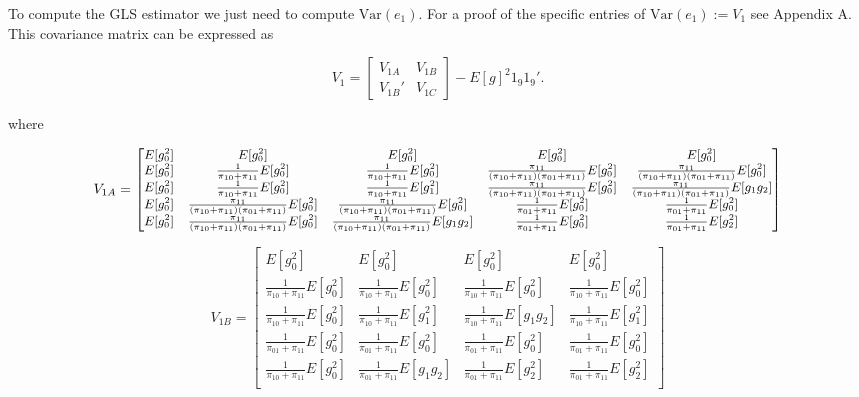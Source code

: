 \documentclass[
  letterpaper,
  DIV=11,
  numbers=noendperiod]{scrartcl}
\newcommand{\Var}{{\text{Var}}}
\begin{document}
To compute the GLS estimator we just need to compute \(\Var(e_1)\). For
a proof of the specific entries of \(\Var(e_1) := V_1\) see Appendix A.
This covariance matrix can be expressed as

\[
V_1 = 
\begin{bmatrix}
V_{1A} & V_{1B} \\
V_{1B}' & V_{1C}
\end{bmatrix} - E[g]^2 1_9 1_9'.
\]

where

\[
V_{1A} = 
{\small
\begin{bmatrix}
E[g_0^2] & E[g_0^2] & E[g_0^2] & E[g_0^2] & E[g_0^2] \\
E[g_0^2] & \frac{1}{\pi_{10} + \pi_{11}}E[g_0^2] & \frac{1}{\pi_{10} + \pi_{11}}
  E[g_0^2] & \frac{\pi_{11}}{(\pi_{10} + \pi_{11})(\pi_{01} + \pi_{11})} E[g_0^2]
  & \frac{\pi_{11}}{(\pi_{10} + \pi_{11})(\pi_{01} + \pi_{11})} E[g_0^2] \\
E[g_0^2] & \frac{1}{\pi_{10} + \pi_{11}} E[g_0^2] & \frac{1}{\pi_{10} +
  \pi_{11}}E[g_1^2] & \frac{\pi_{11}}{(\pi_{10} + \pi_{11})(\pi_{01} +
  \pi_{11})}E[g_0^2] & \frac{\pi_{11}}{(\pi_{10} + \pi_{11})(\pi_{01} +
  \pi_{11})}E[g_1g_2] \\
E[g_0^2] & \frac{\pi_{11}}{(\pi_{10} + \pi_{11})(\pi_{01} + \pi_{11})} E[g_0^2]
  & \frac{\pi_{11}}{(\pi_{10} + \pi_{11})(\pi_{01} + \pi_{11})} E[g_0^2] &
  \frac{1}{\pi_{01} + \pi_{11}}E[g_0^2] &
  \frac{1}{\pi_{01} + \pi_{11}}E[g_0^2] \\
E[g_0^2] & \frac{\pi_{11}}{(\pi_{10} + \pi_{11})(\pi_{01} + \pi_{11})} E[g_0^2]
  & \frac{\pi_{11}}{(\pi_{10} + \pi_{11})(\pi_{01} + \pi_{11})} E[g_1g_2] &
  \frac{1}{\pi_{01} + \pi_{11}}E[g_0^2] &
  \frac{1}{\pi_{01} + \pi_{11}}E[g_2^2] \\
\end{bmatrix}
}
\]

\[
V_{1B} = 
\begin{bmatrix}
E[g_0^2] & E[g_0^2] & E[g_0^2] & E[g_0^2] \\
\frac{1}{\pi_{10} + \pi_{11}} E[g_0^2] & \frac{1}{\pi_{10} + \pi_{11}} E[g_0^2] &
  \frac{1}{\pi_{10} + \pi_{11}} E[g_0^2] & \frac{1}{\pi_{10} + \pi_{11}} E[g_0^2] \\
\frac{1}{\pi_{10} + \pi_{11}} E[g_0^2] & \frac{1}{\pi_{10} + \pi_{11}} E[g_1^2] &
  \frac{1}{\pi_{10} + \pi_{11}} E[g_1g_2] & \frac{1}{\pi_{10} + \pi_{11}} E[g_1^2] \\
\frac{1}{\pi_{01} + \pi_{11}} E[g_0^2] & \frac{1}{\pi_{01} + \pi_{11}} E[g_0^2] &
  \frac{1}{\pi_{01} + \pi_{11}} E[g_0^2] & \frac{1}{\pi_{01} + \pi_{11}} E[g_0^2] \\
\frac{1}{\pi_{10} + \pi_{11}} E[g_0^2] & \frac{1}{\pi_{01} + \pi_{11}} E[g_1g_2] &
  \frac{1}{\pi_{01} + \pi_{11}} E[g_2^2] & \frac{1}{\pi_{01} + \pi_{11}} E[g_2^2] \\
\end{bmatrix}
\]
\end{document}
